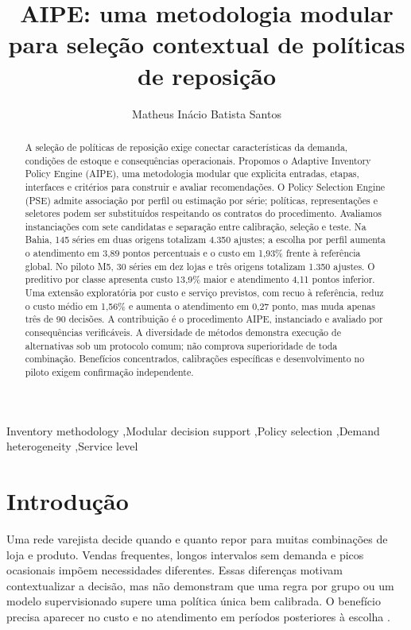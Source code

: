 \documentclass[preprint,12pt]{elsarticle}
\begin{document}
\begin{frontmatter}
\title{AIPE: uma metodologia modular para seleção contextual de políticas de reposição}
\author[ufal]{Matheus Inácio Batista Santos}
\begin{abstract}
A seleção de políticas de reposição exige conectar características da demanda, condições de estoque e consequências operacionais. Propomos o Adaptive Inventory Policy Engine (AIPE), uma metodologia modular que explicita entradas, etapas, interfaces e critérios para construir e avaliar recomendações. O Policy Selection Engine (PSE) admite associação por perfil ou estimação por série; políticas, representações e seletores podem ser substituídos respeitando os contratos do procedimento. Avaliamos instanciações com sete candidatas e separação entre calibração, seleção e teste. Na Bahia, 145 séries em duas origens totalizam 4.350 ajustes; a escolha por perfil aumenta o atendimento em 3,89 pontos percentuais e o custo em 1,93\% frente à referência global. No piloto M5, 30 séries em dez lojas e três origens totalizam 1.350 ajustes. O preditivo por classe apresenta custo 13,9\% maior e atendimento 4,11 pontos inferior. Uma extensão exploratória por custo e serviço previstos, com recuo à referência, reduz o custo médio em 1,56\% e aumenta o atendimento em 0,27 ponto, mas muda apenas três de 90 decisões. A contribuição é o procedimento AIPE, instanciado e avaliado por consequências verificáveis. A diversidade de métodos demonstra execução de alternativas sob um protocolo comum; não comprova superioridade de toda combinação. Benefícios concentrados, calibrações específicas e desenvolvimento no piloto exigem confirmação independente.
\end{abstract}
\begin{keyword}
Inventory methodology \sep Modular decision support \sep Policy selection \sep Demand heterogeneity \sep Service level
\end{keyword}
\end{frontmatter}

\section{Introdução}
Uma rede varejista decide quando e quanto repor para muitas combinações de loja e produto. Vendas frequentes, longos intervalos sem demanda e picos ocasionais impõem necessidades diferentes. Essas diferenças motivam contextualizar a decisão, mas não demonstram que uma regra por grupo ou um modelo supervisionado supere uma política única bem calibrada. O benefício precisa aparecer no custo e no atendimento em períodos posteriores à escolha \cite{Axsater2006InventoryControl}.
\end{document}
